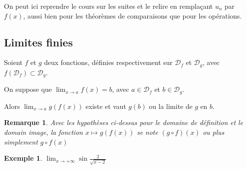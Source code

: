 \documentclass[12pt,a4paper]{article}
\theoremstyle{break}
\theoremstyle{plain}
\theoremstyle{nonumberplain}
\newtheorem{remarque}{Remarque}
\theoremstyle{nonumberbreak}
\newtheorem{exemple}{Exemple}
\begin{document}
On peut ici reprendre le cours sur les suites et le relire en remplaçant
$u_n$ par $f(x)$, aussi bien pour les théorèmes de comparaisons que pour
les opérations.

\subsection{Limites finies}

Soient $f$ et $g$ deux fonctions, définies respectivement sur
$\mathcal{D}_f$ et $\mathcal{D}_g$, avec $f(\mathcal{D}_f)\subset
\mathcal{D}_g$.

On suppose que $\lim_{x\to a}f(x) = b$, avec $a\in\mathcal{D}_f$ et
$b\in\mathcal{D}_g$.

Alors $\lim_{x\to a}g(f(x))$ existe et vaut $g(b)$ ou la limite de $g$
en $b$.

\begin{remarque}
  Avec les hypothèses ci-dessus pour le domaine de définition et le
  domain image, la fonction $x\mapsto g(f(x))$ se note $(g\circ f)(x)$
  ou plus simplement $g\circ f(x)$
\end{remarque}

\begin{exemple}
  $\lim_{x\to+\infty}\sin\frac{2}{\sqrt{x-2}}$
\end{exemple}
\end{document}
